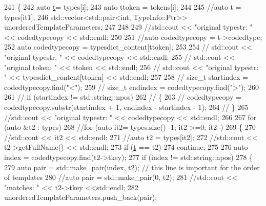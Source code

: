 \begin{DoxyCode}
241     \{
242         \textcolor{keyword}{auto} \hyperlink{namespacebattery__monitor__node_a7a63d20d1ea461e280f4eb5b47f925cd}{t}= types[i];
243         \textcolor{keyword}{auto} ttoken = tokens[i];
244 
245         \textcolor{comment}{//auto t = types[it1];}
246         std::vector<std::pair<int, TypeInfo::Ptr>> unorderedTemplateParameters;
247 
248         
249         \textcolor{comment}{//std::cout << "original typestr: " << codedtypecopy << std::endl;}
250 
251         \textcolor{comment}{//auto codedtypecopy = t->codedtype;}
252         \textcolor{keyword}{auto} codedtypecopy = typesdict\_content[ttoken];
253 
254         \textcolor{comment}{// std::cout << "original typestr: " << codedtypecopy << std::endl;}
255         \textcolor{comment}{// std::cout << "original token: " << ttoken << std::endl;}
256         \textcolor{comment}{// std::cout << "original typestr: " << typesdict\_content[ttoken] << std::endl;}
257 
258         \textcolor{comment}{// size\_t startindex = codedtypecopy.find("<");}
259         \textcolor{comment}{// size\_t endindex = codedtypecopy.find(">");}
260 
261         \textcolor{comment}{// if (startindex != std::string::npos)}
262         \textcolor{comment}{// \{}
263         \textcolor{comment}{//     codedtypecopy = codedtypecopy.substr(startindex + 1, endindex - startindex - 1);}
264         \textcolor{comment}{// \}}
265         \textcolor{comment}{//std::cout << "original typestr: " << codedtypecopy << std::endl;}
266 
267         \textcolor{keywordflow}{for} (\textcolor{keyword}{auto} &t2 : types)
268         \textcolor{comment}{//for (auto it2= types.size() -1; it2 >=0; it2--)}
269         \{
270             \textcolor{comment}{//std::cout << it2 << std::endl;}
271             \textcolor{comment}{//auto t2 = types[it2];}
272             \textcolor{comment}{//std::cout << t2->getFullName() << std::endl;}
273             \textcolor{keywordflow}{if} (\hyperlink{namespacebattery__monitor__node_a7a63d20d1ea461e280f4eb5b47f925cd}{t} == t2)
274                 \textcolor{keywordflow}{continue};
275 
276             \textcolor{keyword}{auto} index = codedtypecopy.find(t2->tkey);
277             \textcolor{keywordflow}{if} (index != std::string::npos)
278             \{
279                 \textcolor{keyword}{auto} pair = std::make\_pair(index, t2); \textcolor{comment}{// this line is important for the order of templates}
280                 \textcolor{comment}{//auto pair = std::make\_pair(0, t2);}
281                 \textcolor{comment}{//std::cout << "matches: " << t2->tkey <<std::endl;}
282                 unorderedTemplateParameters.push\_back(pair);

\end{DoxyCode}

